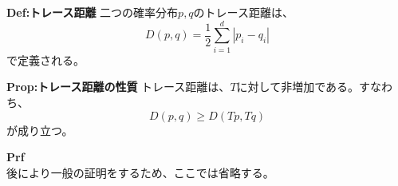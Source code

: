 \documentclass[a4paper,11pt]{jsarticle}
\numberwithin{equation}{section}
\begin{document}
\begin{itembox}[l]{\textbf{Def:トレース距離}}
    二つの確率分布$p, q$のトレース距離は、
    \begin{equation}
        D(p, q) = \frac{1}{2}\sum_{i=1}^{d}|p_i - q_i|
    \end{equation}
    で定義される。
\end{itembox}
\begin{itembox}[l]{\textbf{Prop:トレース距離の性質}}
    トレース距離は、$T$に対して非増加である。すなわち、
    \begin{equation}
        D(p,q) \geq D(Tp, Tq)
    \end{equation}
    が成り立つ。
\end{itembox}
\textbf{Prf}\\
後により一般の証明をするため、ここでは省略する。\\
\end{document}
